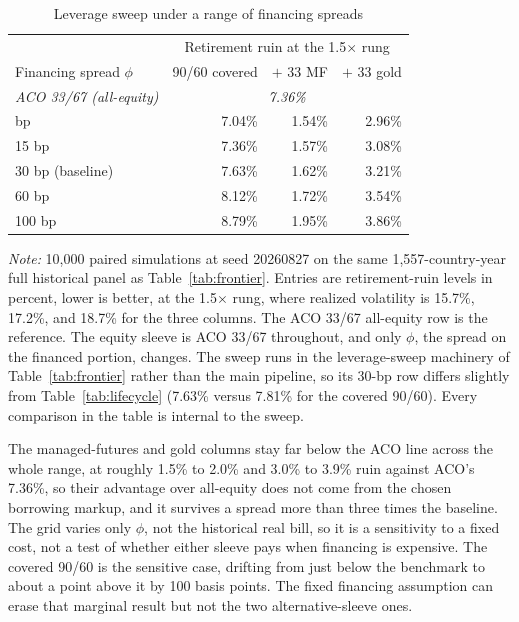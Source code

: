 \documentclass[11pt]{article}
\begin{document}
\begin{table}[H]
\centering
\caption{Leverage sweep under a range of financing spreads}
\label{tab:spread}
\setlength{\tabcolsep}{6pt}
\small
\begin{tabular}{lrrr}
\toprule
& \multicolumn{3}{c}{Retirement ruin at the 1.5$\times$ rung} \\
Financing spread $\phi$ & 90/60 covered & $+$ 33 MF & $+$ 33 gold \\
\midrule
\emph{ACO 33/67 (all-equity)} & \multicolumn{3}{c}{\emph{7.36\%}} \\
\addlinespace
0 bp & 7.04\% & 1.54\% & 2.96\% \\
15 bp & 7.36\% & 1.57\% & 3.08\% \\
30 bp (baseline) & 7.63\% & 1.62\% & 3.21\% \\
60 bp & 8.12\% & 1.72\% & 3.54\% \\
100 bp & 8.79\% & 1.95\% & 3.86\% \\
\bottomrule
\end{tabular}
\begin{minipage}{0.92\textwidth}\footnotesize
\textit{Note:} 10,000 paired simulations at seed 20260827 on the same
1{,}557-country-year full historical panel as Table~\ref{tab:frontier}. Entries
are retirement-ruin levels in percent, lower is better, at the 1.5$\times$
rung, where realized volatility is 15.7\%, 17.2\%, and 18.7\% for the three
columns. The ACO 33/67 all-equity row is the reference. The equity sleeve is
ACO 33/67 throughout, and only $\phi$, the spread on the financed portion,
changes. The sweep runs in the leverage-sweep machinery of
Table~\ref{tab:frontier} rather than the main pipeline, so its 30-bp row
differs slightly from Table~\ref{tab:lifecycle} (7.63\% versus 7.81\% for the
covered 90/60). Every comparison in the table is internal to the sweep.
\end{minipage}
\end{table}

The managed-futures and gold columns stay far below the ACO line across the
whole range, at roughly 1.5\% to 2.0\% and 3.0\% to 3.9\% ruin against
ACO's 7.36\%, so their advantage over all-equity does not come from the
chosen borrowing markup, and it survives a spread more than three times the
baseline. The grid varies only $\phi$, not the historical real bill, so it is a
sensitivity to a fixed cost, not a test of whether either sleeve pays when
financing is expensive. The covered 90/60 is the sensitive case, drifting from
just below the benchmark to about a point above it by 100 basis points. The
fixed financing assumption can erase that marginal result but not the two
alternative-sleeve ones.
\end{document}
